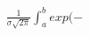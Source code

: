 \documentclass[preview]{standalone}
\begin{document}
\begin{align*}
{ \frac{1}{\sigma \sqrt{2\pi}} } \int_a^b { exp(-{}}
\end{align*}
\end{document}
